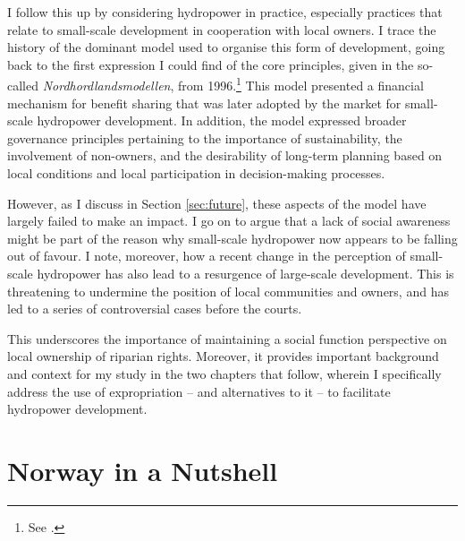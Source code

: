 I follow this up by considering hydropower in practice, especially practices that relate to small-scale development in cooperation with local owners. I trace the history of the dominant model used to organise this form of development, going back to the first expression I could find of the core principles, given in the so-called {\it Nordhordlandsmodellen}, from 1996.\footnote{See \cite{dyrkolbotn96}.} This model presented a financial mechanism for benefit sharing that was later adopted by the market for small-scale hydropower development. In addition, the model expressed broader governance principles pertaining to the importance of sustainability, the involvement of non-owners, and the desirability of long-term planning based on local conditions and local participation in decision-making processes.

However, as I discuss in Section \ref{sec:future}, these aspects of the model have largely failed to make an impact. I go on to argue that a lack of social awareness  might be part of the reason why small-scale hydropower now appears to be falling out of favour. I note, moreover, how a recent change in the perception of small-scale hydropower has also lead to a resurgence of large-scale development. This is threatening to undermine the position of local communities and owners, and has led to a series of controversial cases before the courts.

This underscores the importance of maintaining a social function perspective on local ownership of riparian rights. Moreover, it provides important background and context for my study in the two chapters that follow, wherein I specifically address the use of expropriation -- and alternatives to it --  to facilitate hydropower development.

\section{Norway in a Nutshell}\label{sec:nutshell}

